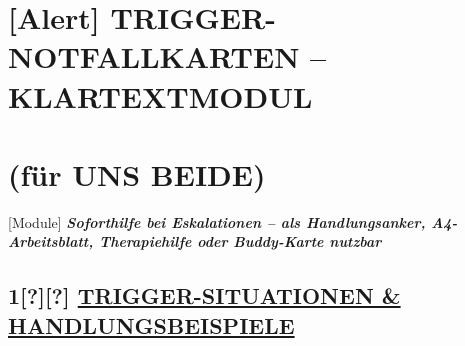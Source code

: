 \hypertarget{trigger-notfallkarten-klartextmodul}{%
\section{\texorpdfstring{\textbf{[Alert] TRIGGER-NOTFALLKARTEN -- KLARTEXTMODUL} }{[Alert] TRIGGER-NOTFALLKARTEN -- KLARTEXTMODUL }}\label{trigger-notfallkarten-klartextmodul}}

\hypertarget{fuxfcr-uns-beide}{%
\section{\texorpdfstring{\textbf{(für UNS BEIDE)}}{(für UNS BEIDE)}}\label{fuxfcr-uns-beide}}

[Module] \emph{\textbf{Soforthilfe bei Eskalationen -- als Handlungsanker, A4-Arbeitsblatt, Therapiehilfe oder Buddy-Karte nutzbar}}

\hypertarget{trigger-situationen-handlungsbeispiele}{%
\subsection{\texorpdfstring{\textbf{1[?][?] \ul{TRIGGER-SITUATIONEN \& HANDLUNGSBEISPIELE}}}{1[?][?] TRIGGER-SITUATIONEN \& HANDLUNGSBEISPIELE}}\label{trigger-situationen-handlungsbeispiele}}

